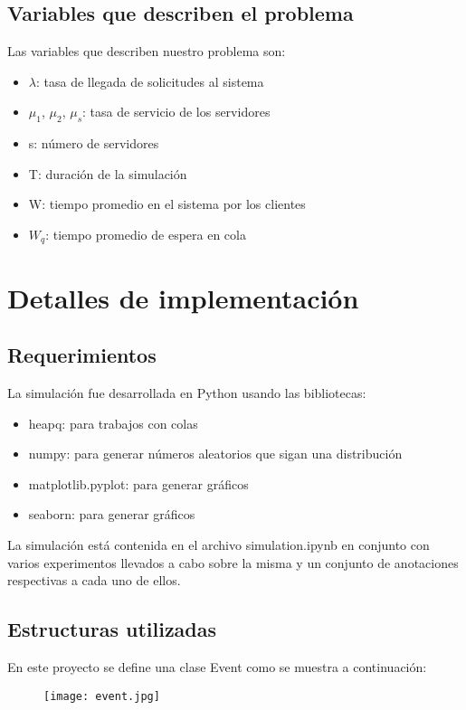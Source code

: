 \documentclass[12pt,a4paper]{article}
\begin{document}
\subsection{Variables que describen el problema} 
Las variables que describen nuestro problema son:
\begin{itemize}
\item $\lambda$: tasa de llegada de solicitudes al sistema
\item $\mu_1$, $\mu_2$, $\mu_s$: tasa de servicio de los servidores
\item s: número de servidores
\item T: duración de la simulación
\item W: tiempo promedio en el sistema por los clientes
\item $W_q$: tiempo promedio de espera en cola
\end{itemize}


\section{Detalles de implementación}
\subsection{Requerimientos} 
La simulación fue desarrollada en Python usando las bibliotecas:
\begin{itemize}
\item heapq: para trabajos con colas
\item numpy: para generar números aleatorios que sigan una distribución
\item matplotlib.pyplot: para generar gráficos
\item seaborn: para generar gráficos
\end{itemize}

La simulación está contenida en el archivo simulation.ipynb en conjunto con varios experimentos llevados
a cabo sobre la misma y un conjunto de anotaciones respectivas a cada uno de ellos.
\subsection{Estructuras utilizadas} 
En este proyecto se define una clase Event como se muestra a continuación:\\

\begin{figure}[!h]
    \centering
    \texttt{[image: event.jpg]}
\end{figure}
\end{document}
